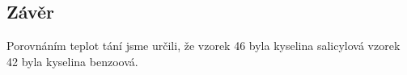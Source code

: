 \documentclass[13pt, a4paper, twoside]{article}
\begin{document}
\begin{enumerate}
\section*{Závěr}
Porovnáním teplot tání jsme určili, že vzorek 46 byla kyselina salicylová vzorek 42 byla kyselina benzoová.



\end{enumerate}
\end{document}
